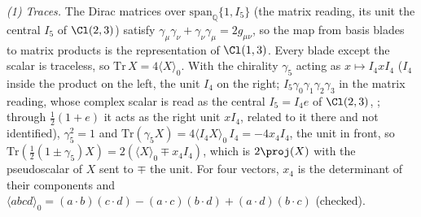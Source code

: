 \emph{(1) Traces.} The Dirac matrices over $\mathrm{span}_{\mathbb{Q}}\{1, I_{5}\}$ (the matrix reading, its unit the central $I_{5}$ of $\Cl(2,3)$) satisfy $\gamma_{\mu}\gamma_{\nu} + \gamma_{\nu}\gamma_{\mu} = 2g_{\mu\nu}$, so the map from basis blades to matrix products is the representation of $\Cl(1,3)$. Every blade except the scalar is traceless, so $\mathrm{Tr}\,X = 4\langle X\rangle_{0}$. With the chirality $\gamma_{5}$ acting as $x \mapsto I_{4}xI_{4}$ ($I_{4}$ inside the product on the left, the unit $I_{4}$ on the right; $I_{5}\gamma_{0}\gamma_{1}\gamma_{2}\gamma_{3}$ in the matrix reading, whose complex scalar is read as the central $I_{5} = I_{4}e$ of $\Cl(2,3)$, ; through $\tfrac12(1 + e)$ it acts as the right unit $xI_{4}$, related to it there and not identified), $\gamma_{5}^{2} = 1$ and $\mathrm{Tr}(\gamma_{5}X) = 4\langle I_{4}X\rangle_{0}\,I_{4} = -4x_{4}I_{4}$, the unit in front, so $\mathrm{Tr}(\tfrac12(1 \pm \gamma_{5})X) = 2(\langle X\rangle_{0} \mp x_{4}I_{4})$, which is $2\proj(X)$ with the pseudoscalar of $X$ sent to $\mp$ the unit. For four vectors, $x_{4}$ is the determinant of their components and $\langle abcd\rangle_{0} = (a\cdot b)(c\cdot d) - (a\cdot c)(b\cdot d) + (a\cdot d)(b\cdot c)$ (checked).

